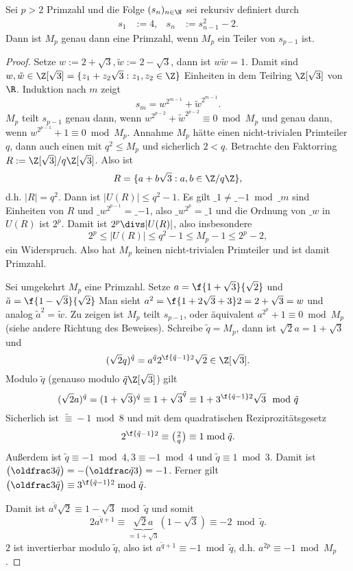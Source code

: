 \begin{st} \label{3.17}
	Sei $p > 2$ Primzahl und die Folge $(s_n)_{n\in\N}$ sei rekursiv definiert durch
	\begin{align*}
		s_1 &:= 4, &
		s_{n} &:= s_{n-1}^2 - 2.
	\end{align*}
	Dann ist $M_p$ genau dann eine Primzahl, wenn $M_p$ ein Teiler von $s_{p-1}$ ist.
	\begin{proof}
		Setze $w := 2 + \sqrt 3, \tilde w := 2 - \sqrt 3$, dann ist $w\tilde w = 1$.
		Damit sind $w, \tilde w \in \Z[\sqrt{3}] = \{ z_1 + z_2 \sqrt{3} : z_1, z_2 \in \Z \}$ Einheiten in dem Teilring $\Z[\sqrt{3}]$ von $\R$.
		Induktion nach $m$ zeigt \Exercise
		\[
			s_m = w^{2^{m-1}} + \tilde w^{2^{m-1}}.
		\]
		$M_p$ teilt $s_{p-1}$ genau dann, wenn $w^{2^{p-2}} + \tilde w^{2^{p-2}} \equiv 0 \bmod M_p$ und genau dann, wenn $w^{2^{p-1}} + 1 \equiv 0 \bmod M_p$.
		Annahme $M_p$ hätte einen nicht-trivialen Primteiler $q$, dann auch einen mit $q^2 \le M_p$ und sicherlich $2 < q$.
		Betrachte den Faktorring $R := \Z[\sqrt{3}] / q\Z[\sqrt{3}]$.
		Also ist
		\[
			R = \{ a + b\sqrt{3} : a,b \in \Z / q\Z \},
		\]
		d.h. $|R| = q^2$.
		Dann ist $|U(R)| \le q^2 - 1$.
		Es gilt $\_{1} \neq \_{-1} \bmod \_m$ sind Einheiten von $R$ und $\_w^{2^{p-1}} = \_{-1}$, also $\_w^{2^p} = \_ 1$ und die Ordnung von $\_w$ in $U(R)$ ist $2^p$.
		Damit ist $2^p \divs |U(R)|$, also insbesondere
		\[
			2^p \le |U(R)| \le q^2 - 1 \le M_p - 1 \le 2^{p}-2,
		\]
		ein Widerspruch.
		Also hat $M_p$ keinen nicht-trivialen Primteiler und ist damit Primzahl.

		Sei umgekehrt $M_p$ eine Primzahl.
		Setze $a = \f{1 + \sqrt{3}}{\sqrt{2}}$ und $\tilde a = \f{1 - \sqrt{3}}{\sqrt{2}}$
		Man sieht $a^2 = \f{1 + 2\sqrt{3} + 3}2 = 2 + \sqrt{3} = w$ und analog $\tilde a^2 = \tilde w$.
		Zu zeigen ist $M_p$ teilt $s_{p-1}$, oder äquivalent $a^{2^p} + 1 \equiv 0 \bmod M_p$ (siehe andere Richtung des Beweises).
		Schreibe $\tilde q = M_p$, dann ist $\sqrt{2} a = 1 + \sqrt{3}$ und
		\[
			(\sqrt{2} q)^{\tilde q} = a^{\tilde q} 2^{\f{\tilde q - 1}2} \sqrt{2}
			\in \Z[\sqrt{3}].
		\]
		Modulo $\tilde q$ (genauso modulo $\tilde q \Z[\sqrt{3}]$) gilt
		\[
			(\sqrt 2 a)^{\tilde q}
			= (1 + \sqrt 3)^{\tilde q}
			\equiv 1 + \sqrt{3}^{\tilde q}
			\equiv 1 + 3^{\f{\tilde q -1}2} \sqrt{3}
			\mod \tilde q
		\]
		Sicherlich ist $\tilde \equiv -1 \bmod 8$ und mit dem quadratischen Reziprozitätsgesetz
		\[
			2^{\f{\tilde q - 1}2} \equiv \legsym{2}{q}
			\equiv 1 \bmod \tilde q.
		\]
		Außerdem ist $\tilde q \equiv -1 \bmod 4, 3 \equiv -1 \bmod 4$ und $\tilde q \equiv 1 \bmod 3$.
		Damit ist $\legsym{3}{\tilde q} = - \legsym{\tilde q}{3} = -1$.
		Ferner gilt $\legsym{3}{\tilde q} \equiv 3^{\f{\tilde q-1}2} \bmod \tilde q$.

		Damit ist $a^{\tilde q} \sqrt{2} \equiv 1 - \sqrt{3} \bmod \tilde q$ und somit
		\[
			2 a^{\tilde q + 1}
			\equiv \underbrace{\sqrt{2} a}_{=1+\sqrt{3}} (1 - \sqrt{3})
			\equiv -2 \bmod \tilde q.
		\]
		$2$ ist invertierbar modulo $\tilde q$, also ist $a^{\tilde q + 1} \equiv -1 \bmod \tilde q$, d.h. $a^{2p} \equiv -1 \bmod M_p$.
	\end{proof}
\end{st}

